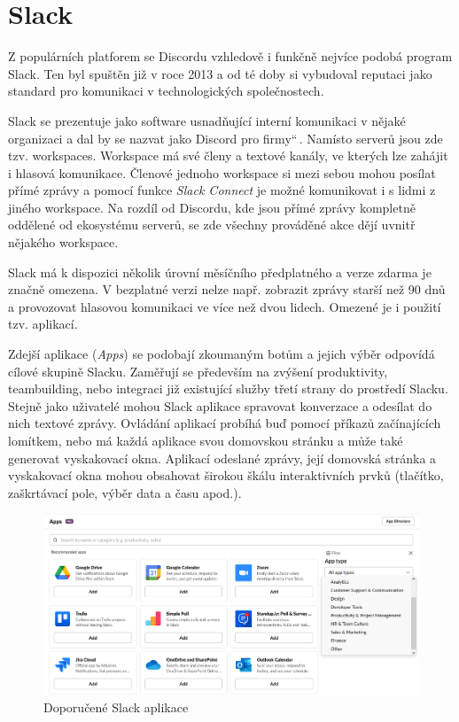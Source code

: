 \documentclass[FM]{tulthesis}
\begin{document}
	\section{Slack}
	
	Z populárních platforem se Discordu vzhledově i funkčně nejvíce podobá program Slack. Ten byl spuštěn již v roce 2013 a od té doby si vybudoval reputaci jako standard pro komunikaci v technologických společnostech. \cite{lit_Discord}
	
	Slack se prezentuje jako software usnadňující interní komunikaci v nějaké organizaci a dal by se nazvat jako \quotedblbase Discord pro firmy\textquotedblleft\,. Namísto serverů jsou zde tzv. workspaces. Workspace má své členy a textové kanály, ve kterých lze zahájit i hlasová komunikace. Členové jednoho workspace si mezi sebou mohou posílat přímé zprávy a pomocí funkce \textit{Slack Connect} je možné komunikovat i s lidmi z jiného workspace. Na rozdíl od Discordu, kde jsou přímé zprávy kompletně oddělené od ekosystému serverů, se zde všechny prováděné akce dějí uvnitř nějakého workspace.
	
	Slack má k dispozici několik úrovní měsíčního předplatného a verze zdarma je značně omezena. V bezplatné verzi nelze např. zobrazit zprávy starší než 90 dnů a provozovat hlasovou komunikaci ve více než dvou lidech. Omezené je i použití tzv. aplikací.
	
	Zdejší aplikace (\textit{Apps}) se podobají zkoumaným botům a jejich výběr odpovídá cílové skupině Slacku. Zaměřují se především na zvýšení produktivity, teambuilding, nebo integraci již existující služby třetí strany do prostředí Slacku. Stejně jako uživatelé mohou Slack aplikace spravovat konverzace a odesílat do nich textové zprávy. Ovládání aplikací probíhá buď pomocí příkazů začínajících lomítkem, nebo má každá aplikace svou domovskou stránku a může také generovat vyskakovací okna. Aplikací odeslané zprávy, její domovská stránka a vyskakovací okna mohou obsahovat širokou škálu interaktivních prvků (tlačítko, zaškrtávací pole, výběr data a času apod.).
	
	\begin{figure}[ht]
		\centering
		\includegraphics[width=\textwidth]{img/SlackApps}
		\caption{Doporučené Slack aplikace}
	\end{figure}
	
\end{document}

